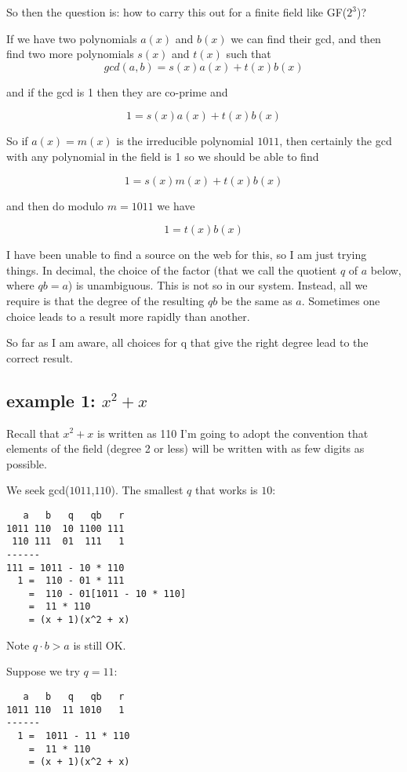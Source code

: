 \documentclass[11pt, oneside]{article}
\begin{document}
So then the question is:  how to carry this out for a finite field like GF($2^3$)?

If we have two polynomials $a(x)$ and $b(x)$ we can find their gcd, and then find two more polynomials $s(x)$ and $t(x)$ such that
\[ gcd(a,b) = s(x)a(x) + t(x)b(x) \]

and if the gcd is 1 then they are co-prime and

\[ 1 = s(x)a(x) + t(x)b(x) \]

So if $a(x) = m(x)$ is the irreducible polynomial $1011$, then certainly the gcd with any polynomial in the field is 1 so we should be able to find

\[ 1 = s(x)m(x) + t(x)b(x) \]

and then do modulo $m = 1011$ we have

\[ 1 = t(x)b(x) \]

I have been unable to find a source on the web for this, so I am just trying things.  In decimal, the choice of the factor (that we call the quotient $q$ of $a$ below, where $qb = a$) is unambiguous.  This is not so in our system.  Instead, all we require is that the degree of the resulting $qb$ be the same as $a$.  Sometimes one choice leads to a result more rapidly than another.

So far as I am aware, all choices for q that give the right degree lead to the correct result.

\subsection*{example 1: $ x^2 + x$}
Recall that $x^2 + x$ is written as 110   I'm going to adopt the convention that elements of the field (degree 2 or less) will be written with as few digits as possible.

We seek gcd($1011$,$110$).  The smallest $q$ that works is $10$:
\begin{verbatim}
   a   b   q   qb   r
1011 110  10 1100 111
 110 111  01  111   1
------
111 = 1011 - 10 * 110
  1 =  110 - 01 * 111
    =  110 - 01[1011 - 10 * 110]
    =  11 * 110
    = (x + 1)(x^2 + x)
\end{verbatim}

Note $q \cdot b > a$ is still OK.

Suppose we try $q = 11$:
\begin{verbatim}
   a   b   q   qb   r
1011 110  11 1010   1
------
  1 =  1011 - 11 * 110
    =  11 * 110
    = (x + 1)(x^2 + x)
\end{verbatim}
\end{document}
